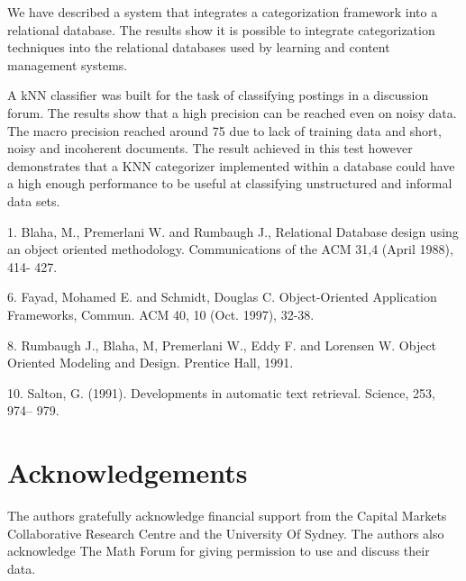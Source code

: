 \documentclass[twocolumn]{article}
\begin{document}
We have described a system that integrates a categorization framework into a 
relational database. The results show it is possible to integrate categorization 
techniques into the relational databases used by learning and content management 
systems.

A kNN classifier was built for the task of classifying postings in a discussion forum. 
The results show that a high precision can be reached even on  noisy data. The macro 
precision reached around 75%
due to lack of training data and short, noisy and incoherent documents. The result 
achieved in this test however demonstrates that a KNN categorizer implemented 
within a database could have a high enough performance to be useful at classifying 
unstructured and informal data sets. 

1. Blaha, M., Premerlani W. and Rumbaugh J., Relational Database design using an 
object oriented methodology. Communications of the ACM 31,4 (April 1988), 414-
427.

6. Fayad, Mohamed E. and Schmidt, Douglas C. Object-Oriented Application 
Frameworks, Commun. ACM 40, 10 (Oct. 1997), 32-38.

8. Rumbaugh J., Blaha, M, Premerlani W., Eddy F. and Lorensen W. Object Oriented 
Modeling and Design. Prentice Hall, 1991.

10. Salton, G. (1991). Developments in automatic text retrieval. Science, 253, 974--
979.

\section*{Acknowledgements}

The authors gratefully acknowledge financial support from the Capital Markets 
Collaborative Research Centre and the University Of Sydney. The authors also 
acknowledge The Math Forum for giving permission to use and discuss their data. 



\end{document}
